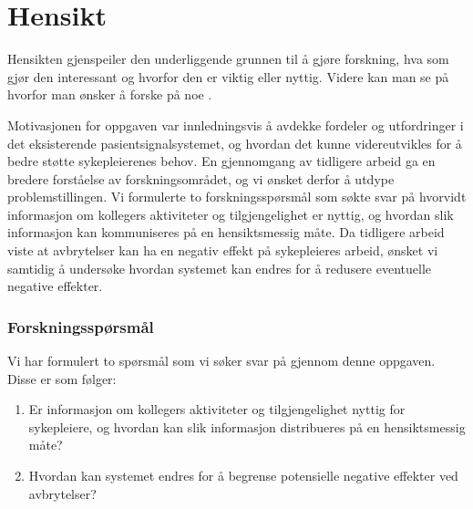 \section{Hensikt}
\label{chp: hensikt}

Hensikten gjenspeiler den underliggende grunnen til å gjøre forskning, hva som gjør den interessant og hvorfor den er viktig eller nyttig. Videre kan man se på hvorfor man ønsker å forske på noe \cite{Oates}. 

\noindent
Motivasjonen for oppgaven var innledningsvis å avdekke fordeler og utfordringer i det eksisterende pasientsignalsystemet, og hvordan det kunne videreutvikles for å bedre støtte sykepleierenes behov. En gjennomgang av tidligere arbeid ga en bredere forståelse av forskningsområdet, og vi ønsket derfor å utdype problemstillingen. Vi formulerte to forskningsspørsmål som søkte svar på hvorvidt informasjon om kollegers aktiviteter og tilgjengelighet er nyttig, og hvordan slik informasjon kan kommuniseres på en hensiktsmessig måte. Da tidligere arbeid viste at avbrytelser kan ha en negativ effekt på sykepleieres arbeid, ønsket vi samtidig å undersøke hvordan systemet kan endres for å redusere eventuelle negative effekter.

\subsubsection{Forskningsspørsmål}
Vi har formulert to spørsmål som vi søker svar på gjennom denne oppgaven. Disse er som følger:

\begin{enumerate}
\item Er informasjon om kollegers aktiviteter og tilgjengelighet nyttig for sykepleiere, og hvordan kan slik informasjon distribueres på en hensiktsmessig måte? 
\item Hvordan kan systemet endres for å begrense potensielle negative effekter ved avbrytelser?
\end{enumerate}
